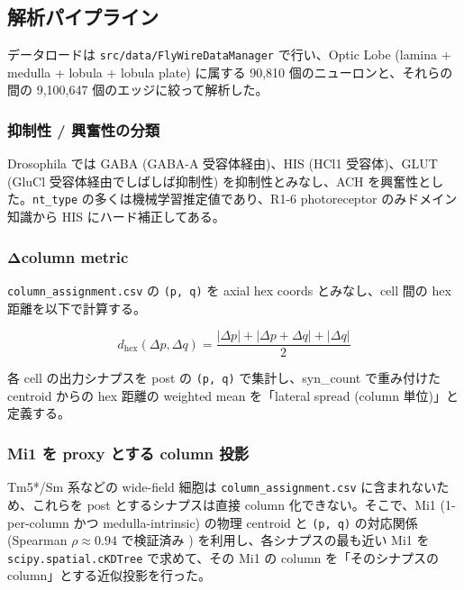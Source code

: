 \documentclass[11pt,a4paper]{ltjsarticle}
\begin{document}
\subsection{解析パイプライン}

データロードは \texttt{src/data/FlyWireDataManager} で行い、Optic Lobe (lamina + medulla + lobula + lobula plate) に属する 90{,}810 個のニューロンと、それらの間の 9{,}100{,}647 個のエッジに絞って解析した。

\subsubsection*{抑制性 / 興奮性の分類}

Drosophila では GABA (GABA-A 受容体経由)、HIS (HCl1 受容体)、GLUT (GluCl 受容体経由でしばしば抑制性) を抑制性とみなし、ACH を興奮性とした。\texttt{nt\_type} の多くは機械学習推定値であり、R1-6 photoreceptor のみドメイン知識から HIS にハード補正してある。

\subsubsection*{Δcolumn metric}

\texttt{column\_assignment.csv} の \texttt{(p, q)} を axial hex coords とみなし、cell 間の hex 距離を以下で計算する。

\begin{equation}
d_\text{hex}(\Delta p, \Delta q) = \frac{|\Delta p| + |\Delta p + \Delta q| + |\Delta q|}{2}
\end{equation}

各 cell の出力シナプスを post の \texttt{(p, q)} で集計し、syn\_count で重み付けた centroid からの hex 距離の weighted mean を「lateral spread (column 単位)」と定義する。

\subsubsection*{Mi1 を proxy とする column 投影}

Tm5*/Sm 系などの wide-field 細胞は \texttt{column\_assignment.csv} に含まれないため、これらを post とするシナプスは直接 column 化できない。そこで、Mi1 (1-per-column かつ medulla-intrinsic) の物理 centroid と \texttt{(p, q)} の対応関係 (Spearman $\rho \approx 0.94$ で検証済み \cite{column_validation}) を利用し、各シナプスの最も近い Mi1 を \texttt{scipy.spatial.cKDTree} で求めて、その Mi1 の column を「そのシナプスの column」とする近似投影を行った。
\end{document}
